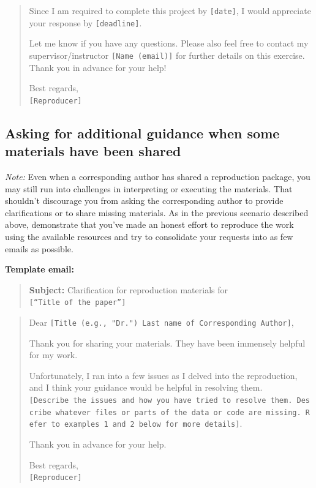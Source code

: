 \documentclass[
]{book}
\begin{document}
\begin{quote}
Since I am required to complete this project by \texttt{{[}date{]}}, I would appreciate your response by \texttt{{[}deadline{]}}.

Let me know if you have any questions. Please also feel free to contact my supervisor/instructor \texttt{{[}Name\ (email){]}} for further details on this exercise. Thank you in advance for your help!

Best regards,\\
\texttt{{[}Reproducer{]}}
\end{quote}

\hypertarget{asking-for-additional-guidance-when-some-materials-have-been-shared}{%
\subsection{Asking for additional guidance when some materials have been shared}\label{asking-for-additional-guidance-when-some-materials-have-been-shared}}

\emph{Note:} Even when a corresponding author has shared a reproduction package, you may still run into challenges in interpreting or executing the materials. That shouldn't discourage you from asking the corresponding author to provide clarifications or to share missing materials. As in the previous scenario described above, demonstrate that you've made an honest effort to reproduce the work using the available resources and try to consolidate your requests into as few emails as possible.

\textbf{Template email:}

\begin{quote}
\textbf{Subject:} Clarification for reproduction materials for \texttt{{[}“Title\ of\ the\ paper”{]}}
\end{quote}

\begin{quote}
Dear \texttt{{[}Title\ (e.g.,\ "Dr.")\ Last\ name\ of\ Corresponding\ Author{]}},

Thank you for sharing your materials. They have been immensely helpful for my work.

Unfortunately, I ran into a few issues as I delved into the reproduction, and I think your guidance would be helpful in resolving them. \texttt{{[}Describe\ the\ issues\ and\ how\ you\ have\ tried\ to\ resolve\ them.\ Describe\ whatever\ files\ or\ parts\ of\ the\ data\ or\ code\ are\ missing.\ Refer\ to\ examples\ 1\ and\ 2\ below\ for\ more\ details{]}}.

Thank you in advance for your help.

Best regards,\\
\texttt{{[}Reproducer{]}}
\end{quote}
\end{document}
